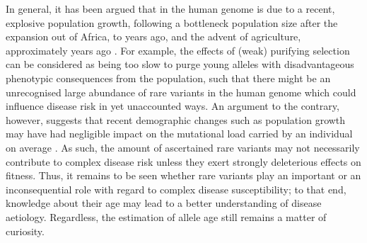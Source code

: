 In general, it has been argued that  in the human genome is due to a recent, explosive population growth, following a bottleneck population size after the expansion out of Africa,  to  years ago, and the advent of agriculture, approximately  years ago \citep{Coventry:2010cqa,Keinan:2012kl,Tennessen:2012ck}.
For example, the effects of (weak) purifying selection can be considered as being too slow to purge young alleles with disadvantageous phenotypic consequences from the population, such that there might be an unrecognised large abundance of rare variants in the human genome which could influence disease risk in yet unaccounted ways.
An argument to the contrary, however, suggests that recent demographic changes such as population growth may have had negligible impact on the mutational load carried by an individual on average \citep{Simons:2014fj}.
As such, the amount of ascertained rare variants may not necessarily contribute to complex disease risk unless they exert strongly deleterious effects on fitness.
Thus, it remains to be seen whether rare variants play an important or an inconsequential role with regard to complex disease susceptibility; to that end, knowledge about their age may lead to a better understanding of disease aetiology.
Regardless, the estimation of allele age still remains a matter of curiosity.
